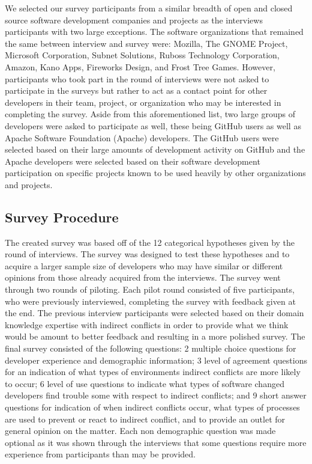 \documentclass[conference]{IEEEtran}
\begin{document}
We selected our survey participants from a similar breadth of open and closed source software development 
companies and projects as the interviews participants with two large exceptions. The software organizations
that remained the same between interview and survey were: Mozilla, The GNOME Project, Microsoft Corporation, 
Subnet Solutions, Ruboss Technology Corporation, Amazon, Kano Apps, Fireworks Design, and Frost Tree Games.
However, participants who took part in the round of interviews were not asked to participate in the surveys but
rather to act as a contact point for other developers in their team, project, or organization who may be interested
in completing the survey. Aside from this aforementioned list, two large groups of developers were asked to
participate as well, these being GitHub users as well as Apache Software Foundation (Apache) developers. The GitHub
users were selected based on their large amounts of development activity on GitHub and the Apache developers
were selected based on their software development participation on specific projects known to be used heavily
by other organizations and projects.

\subsection{Survey Procedure}

The created survey was based off of the 12 categorical hypotheses given by the round of interviews. The survey
was designed to test these hypotheses and to acquire a larger sample size of developers who may have similar
or different opinions from those already acquired from the interviews. The survey went through two rounds of
piloting. Each pilot round consisted of five participants, who were previously interviewed, completing the survey
with feedback given at the end. The previous interview participants were selected based on their domain knowledge
expertise with indirect conflicts in order to provide what we think would be amount to better feedback and resulting
in a more polished survey. The final survey consisted of the following questions:
2 multiple choice questions for developer experience and demographic information; 3 level of agreement questions for an indication of
what types of environments indirect conflicts are more likely to occur;
6 level of use questions to indicate what types of software changed developers find trouble some with respect to
indirect conflicts; and 9 short answer questions for indication of when indirect conflicts occur, what types of
processes are used to prevent or react to indirect conflict, and to provide an outlet for general opinion
on the matter. Each non demographic question was made optional as it was shown 
through the interviews that some questions require more experience from participants than may be provided.
\end{document}
